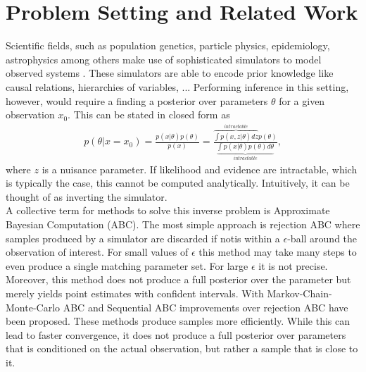 \documentclass[12pt]{article}
\title{\vskip-3em \bf 
	Simulation-based Inference
    }
\author{
    A Summary Written by Stefan Wezel \\
    \texttt{stefan.wezel@student.uni-tuebingen.de}
}
\date{\it Machine Learning for and with Dynamical Systems\\Summer Term 2021}
\begin{document}
\maketitle



\section*{Problem Setting and Related Work}
Scientific fields, such as population genetics, particle physics, epidemiology, astrophysics among others make use of sophisticated simulators to model observed systems \citep{brehmer2020simulation, de2020simulation, delaunoy2020lightning,cranmer2020frontier, pritchard1999population}. These simulators are able to encode prior knowledge like causal relations, hierarchies of variables, ... Performing inference in this setting, however, would require a finding a posterior over parameters $\theta$ for a given observation $x_0$. This can be stated in closed form as 
\begin{align}
	p(\theta|x=x_0) = \frac{p(x|\theta)p(\theta)}{p(x)} = \frac{\overbrace{\int p(x,z|\theta)dz}^{intractable} p(\theta)}{\underbrace{\int p(x|\theta)p(\theta)d\theta}_{intractable}},
\end{align}
where $z$ is a nuisance parameter. If likelihood and evidence are intractable, which is typically the case, this cannot be computed analytically. Intuitively, it can be thought of as inverting the simulator. \\
A collective term for methods to solve this inverse problem is Approximate Bayesian Computation (ABC). The most simple approach is rejection ABC \citep{pritchard1999population} where samples produced by a simulator are discarded if notis within a $\epsilon$-ball around the observation of interest. For small values of $\epsilon$ this method may take many steps to even produce a single matching parameter set. For large $\epsilon$ it is not precise. Moreover, this method does not produce a full posterior over the parameter but merely yields point estimates with confident intervals. With Markov-Chain-Monte-Carlo ABC and Sequential ABC improvements over rejection ABC have been proposed. These methods produce samples more efficiently. While this can lead to faster convergence, it does not produce a full posterior over parameters that is conditioned on the actual observation, but rather a sample that is close to it.
\end{document}
